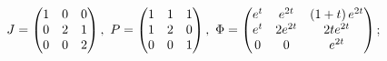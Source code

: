 \begin{enumsolsfull}
		\label{sol:linsys_hmg:transformation_complex}
		\item \( J = \begin{pmatrix} 1 & 0 & 0 \\ 0 & 2 & 1 \\ 0 & 0 & 2 \end{pmatrix}, ~ P = \begin{pmatrix} 1 & 1 & 1 \\ 1 & 2 & 0 \\ 0 & 0 & 1 \end{pmatrix}, ~ \Phi = \begin{pmatrix} e^{t} & e^{2t} & \left( 1 + t \right) e^{2t} \\ e^{t} & 2e^{2t} & 2te^{2t} \\ 0 & 0 & e^{2t} \end{pmatrix} \); %

\end{enumsolsfull}
